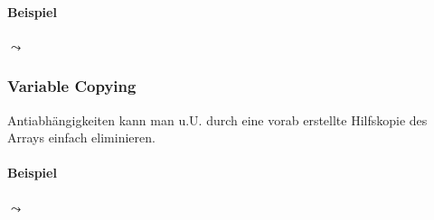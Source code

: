 \paragraph{Beispiel}
\begin{minipage}{.4\textwidth}
\begin{algorithm}[H]
\SetAlgoLined
{}
\end{algorithm}
\end{minipage}
\begin{minipage}{.5\textwidth}
\qquad $\leadsto$ \qquad
\begin{algorithm}[H]
\SetAlgoLined
{}
\end{algorithm}
\end{minipage}
\subsubsection{Variable Copying}

Antiabhängigkeiten kann man u.U. durch eine vorab erstellte Hilfskopie
des Arrays einfach eliminieren.

\paragraph{Beispiel}
\begin{minipage}{.4\textwidth}
\begin{procedure}[H]
\SetAlgoLined
{}
\end{procedure}
\end{minipage}
\qquad $\leadsto$ \qquad
\begin{minipage}{.5\textwidth}
\begin{procedure}[H]
\SetAlgoLined
{}
\end{procedure}

\begin{procedure}[H]
\SetAlgoLined
{}
\end{procedure}
\end{minipage}

